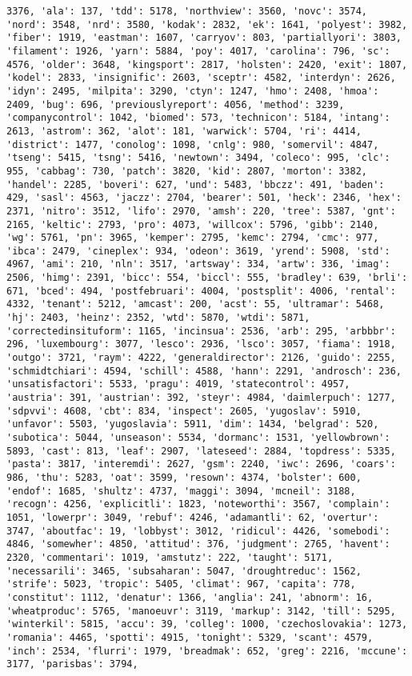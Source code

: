\documentclass[11pt]{article}
\begin{document}
\begin{Verbatim}[commandchars=\\\{\}]
3376, 'ala': 137, 'tdd': 5178, 'northview': 3560, 'novc': 3574, 'nord': 3548, 'nrd': 3580, 'kodak': 2832, 'ek': 1641, 'polyest': 3982, 'fiber': 1919, 'eastman': 1607, 'carryov': 803, 'partiallyori': 3803, 'filament': 1926, 'yarn': 5884, 'poy': 4017, 'carolina': 796, 'sc': 4576, 'older': 3648, 'kingsport': 2817, 'holsten': 2420, 'exit': 1807, 'kodel': 2833, 'insignific': 2603, 'sceptr': 4582, 'interdyn': 2626, 'idyn': 2495, 'milpita': 3290, 'ctyn': 1247, 'hmo': 2408, 'hmoa': 2409, 'bug': 696, 'previouslyreport': 4056, 'method': 3239, 'companycontrol': 1042, 'biomed': 573, 'technicon': 5184, 'intang': 2613, 'astrom': 362, 'alot': 181, 'warwick': 5704, 'ri': 4414, 'district': 1477, 'conolog': 1098, 'cnlg': 980, 'somervil': 4847, 'tseng': 5415, 'tsng': 5416, 'newtown': 3494, 'coleco': 995, 'clc': 955, 'cabbag': 730, 'patch': 3820, 'kid': 2807, 'morton': 3382, 'handel': 2285, 'boveri': 627, 'und': 5483, 'bbczz': 491, 'baden': 429, 'sasl': 4563, 'jaczz': 2704, 'bearer': 501, 'heck': 2346, 'hex': 2371, 'nitro': 3512, 'lifo': 2970, 'amsh': 220, 'tree': 5387, 'gnt': 2165, 'keltic': 2793, 'pro': 4073, 'willcox': 5796, 'gibb': 2140, 'wg': 5761, 'pn': 3965, 'kemper': 2795, 'kemc': 2794, 'cmc': 977, 'ibca': 2479, 'cineplex': 934, 'odeon': 3619, 'yrend': 5908, 'std': 4967, 'ami': 210, 'nln': 3517, 'artsway': 334, 'artw': 336, 'imag': 2506, 'himg': 2391, 'bicc': 554, 'biccl': 555, 'bradley': 639, 'brli': 671, 'bced': 494, 'postfebruari': 4004, 'postsplit': 4006, 'rental': 4332, 'tenant': 5212, 'amcast': 200, 'acst': 55, 'ultramar': 5468, 'hj': 2403, 'heinz': 2352, 'wtd': 5870, 'wtdi': 5871, 'correctedinsituform': 1165, 'incinsua': 2536, 'arb': 295, 'arbbbr': 296, 'luxembourg': 3077, 'lesco': 2936, 'lsco': 3057, 'fiama': 1918, 'outgo': 3721, 'raym': 4222, 'generaldirector': 2126, 'guido': 2255, 'schmidtchiari': 4594, 'schill': 4588, 'hann': 2291, 'androsch': 236, 'unsatisfactori': 5533, 'pragu': 4019, 'statecontrol': 4957, 'austria': 391, 'austrian': 392, 'steyr': 4984, 'daimlerpuch': 1277, 'sdpvvi': 4608, 'cbt': 834, 'inspect': 2605, 'yugoslav': 5910, 'unfavor': 5503, 'yugoslavia': 5911, 'dim': 1434, 'belgrad': 520, 'subotica': 5044, 'unseason': 5534, 'dormanc': 1531, 'yellowbrown': 5893, 'cast': 813, 'leaf': 2907, 'lateseed': 2884, 'topdress': 5335, 'pasta': 3817, 'interemdi': 2627, 'gsm': 2240, 'iwc': 2696, 'coars': 986, 'thu': 5283, 'oat': 3599, 'resown': 4374, 'bolster': 600, 'endof': 1685, 'shultz': 4737, 'maggi': 3094, 'mcneil': 3188, 'recogn': 4256, 'explicitli': 1823, 'noteworthi': 3567, 'complain': 1051, 'lowerpr': 3049, 'rebuf': 4246, 'adamantli': 62, 'overtur': 3747, 'aboutfac': 19, 'lobbyst': 3012, 'ridicul': 4426, 'somebodi': 4846, 'somewher': 4850, 'attitud': 376, 'judgment': 2765, 'havent': 2320, 'commentari': 1019, 'amstutz': 222, 'taught': 5171, 'necessarili': 3465, 'subsaharan': 5047, 'droughtreduc': 1562, 'strife': 5023, 'tropic': 5405, 'climat': 967, 'capita': 778, 'constitut': 1112, 'denatur': 1366, 'anglia': 241, 'abnorm': 16, 'wheatproduc': 5765, 'manoeuvr': 3119, 'markup': 3142, 'till': 5295, 'winterkil': 5815, 'accu': 39, 'colleg': 1000, 'czechoslovakia': 1273, 'romania': 4465, 'spotti': 4915, 'tonight': 5329, 'scant': 4579, 'inch': 2534, 'flurri': 1979, 'breadmak': 652, 'greg': 2216, 'mccune': 3177, 'parisbas': 3794, 
\end{Verbatim}
\end{document}
